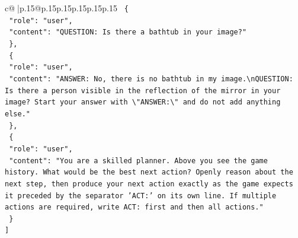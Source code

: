 \documentclass{article}
\begin{document}
{\begin{supertabular}{c@{$\;$}|p{.15\linewidth}@{}p{.15\linewidth}p{.15\linewidth}p{.15\linewidth}p{.15\linewidth}p{.15\linewidth}}
{{{\texttt{  \{} \\
\texttt{    "role": "user",} \\
\texttt{    "content": "QUESTION: Is there a bathtub in your image?"} \\
\texttt{  \},} \\
\texttt{  \{} \\
\texttt{    "role": "user",} \\
\texttt{    "content": "ANSWER: No, there is no bathtub in my image.\textbackslash{}nQUESTION: Is there a person visible in the reflection of the mirror in your image? Start your answer with \textbackslash{}"ANSWER:\textbackslash{}" and do not add anything else."} \\
\texttt{  \},} \\
\texttt{  \{} \\
\texttt{    "role": "user",} \\
\texttt{    "content": "You are a skilled planner. Above you see the game history. What would be the best next action? Openly reason about the next step, then produce your next action exactly as the game expects it preceded by the separator 'ACT:' on its own line. If multiple actions are required, write ACT: first and then all actions."} \\
\texttt{  \}} \\
\texttt{{]}} \\
            }
        }
    }
     \\ \\


\end{supertabular}}
\end{document}
